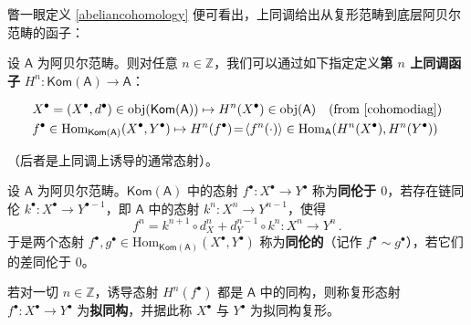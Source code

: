 瞥一眼定义 \ref{abeliancohomology} 便可看出，上同调给出从复形范畴到底层阿贝尔范畴的函子：

\begin{Def}\label{cohomfunc}
	设 $\mathsf{A}$ 为阿贝尔范畴。则对任意 $n\in\mathbb{Z}$，我们可以通过如下指定定义\textbf{第 $n$ 上同调函子} $H^n:\mathsf{Kom(A)}\rightarrow\mathsf{A}$：\begin{small}\begin{equation}
			\begin{aligned}
				&X^\bullet=(X^\bullet, d^\bullet)\in\text{obj}(\mathsf{Kom(A)})\mapsto H^n(X^\bullet)\in\text{obj}(\mathsf{A})\quad \text{(from \eqref{cohomodiag})} \\
				&f^\bullet\in\text{Hom}_\mathsf{Kom(A)}(X^\bullet,Y^\bullet) \mapsto H^n(f^\bullet)\!=\!\langle f^n(\cdot)\rangle\in \text{Hom}_\mathsf{A}(H^n(X^\bullet),H^n(Y^\bullet))
			\end{aligned}
	\end{equation}\end{small}
	\!\!（后者是上同调上诱导的通常态射）。
\end{Def}


\begin{Def}\label{quasiso}
	设 $\mathsf{A}$ 为阿贝尔范畴。$\mathsf{Kom(A)}$ 中的态射 $f^\bullet:X^\bullet\rightarrow Y^\bullet$ 称为\textbf{同伦于 $0$}，若存在链同伦 $k^\bullet:X^\bullet\rightarrow Y^{\bullet-1}$，即 $\mathsf{A}$ 中的态射 $k^n:X^n\rightarrow Y^{n-1}$，使得
	\[
	f^n=k^{n+1}\circ d^n_X + d^{n-1}_Y\circ k^n: X^n\rightarrow Y^n\,. 
	\]
	于是两个态射 $f^\bullet, g^\bullet\in\text{Hom}_\mathsf{Kom(A)}(X^\bullet,Y^\bullet)$ 称为\textbf{同伦的}（记作 $f^\bullet\sim g^\bullet$），若它们的差同伦于 0。
	
	若对一切 $n\in\mathbb{Z}$，诱导态射 $H^n(f^\bullet)$ 都是 $\mathsf{A}$ 中的同构，则称复形态射 $f^\bullet: X^\bullet\rightarrow Y^\bullet$ 为\textbf{拟同构}，并据此称 $X^\bullet$ 与 $Y^\bullet$ 为拟同构复形。
\end{Def}	


